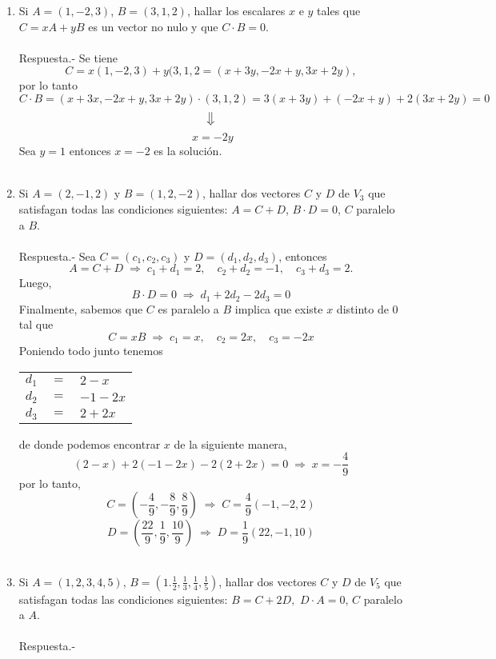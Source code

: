 \begin{enumerate}
\item Si $A = (1,-2,3)$, $B=(3,1,2)$, hallar los escalares $x$ e $y$ tales que $C = xA + yB$ es un vector no nulo y que $C\cdot B = 0$.\\\\
    Respuesta.-\; Se tiene $$C = x(1,-2,3) + y(3,1,2 = (x+3y,-2x+y,3x+2y),$$ por lo tanto $$C\cdot B = (x+3x,-2x+y,3x+2y)\cdot (3,1,2) = 3(x+3y)+(-2x+y)+2(3x+2y) = 0 $$ $$\big\Downarrow$$ $$\; x = -2y$$ 
    Sea $y=1$ entonces $x=-2$ es la solución.\\\\

\item Si $A=(2,-1,2)$ y $B=(1,2,-2)$, hallar dos vectores $C$ y $D$ de $V_3$ que satisfagan todas las condiciones siguientes: $A=C+D$, $B\cdot D = 0$, $C$ paralelo a $B$.\\\\
    Respuesta.-\;  Sea $C=(c_1,c_2,c_3)$ y $D=(d_1,d_2,d_3)$, entonces $$A=C+D \;  \Longrightarrow\; c_1+d_1=2, \quad c_2+d_2=-1, \quad c_3+d_3 = 2.$$
    Luego, $$B\cdot D = 0\; \Longrightarrow \; d_1+2d_2-2d_3=0$$
    Finalmente, sabemos que $C$ es paralelo a $B$ implica que existe $x$ distinto de $0$ tal que 
    $$C=xB \; \Longrightarrow \; c_1=x, \quad c_2=2x, \quad c_3 = -2x$$
    Poniendo todo junto tenemos 
    \begin{center}
	\begin{tabular}{rcl}
	    $d_1$&$=$&$2-x$\\
	    $d_2$&$=$&$-1-2x$\\
	    $d_3$&$=$&$2+2x$\\
	\end{tabular}
    \end{center}
     de donde podemos encontrar $x$ de la siguiente manera,
     $$(2-x)+2(-1-2x)-2(2+2x)=0 \; \Longrightarrow\; x=-\dfrac{4}{9}$$
     por lo tanto, $$C=\left(-\dfrac{4}{9},-\dfrac{8}{9},\dfrac{8}{9}\right) \; \Longrightarrow \;  C=\dfrac{4}{9}(-1,-2,2)$$ $$D=\left(\dfrac{22}{9},\dfrac{1}{9},\dfrac{10}{9} \right) \; \Longrightarrow \; D=\dfrac{1}{9}(22,-1,10)$$\\

 \item Si $A=(1,2,3,4,5)$, $B=(1.\frac{1}{2},\frac{1}{3},\frac{1}{4},\frac{1}{5})$, hallar dos vectores $C$ y $D$ de $V_5$ que satisfagan todas las condiciones siguientes: $B=C+2D,$ $D\cdot A=0$, $C$ paralelo a $A$.\\\\
     Respuesta.-\; 

\end{enumerate}

